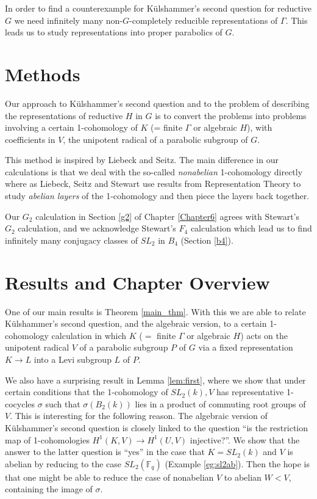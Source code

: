 In order to find a counterexample for K\"ulshammer's second question for reductive $G$ we need infinitely many non-$G$-completely reducible representations of $\Gamma$. This leads us to study representations into proper parabolics of $G$.

\section{Methods}

Our approach to K\"ulshammer's second question and to the problem of describing the representations of reductive $H$ in $G$ is to convert the problems into problems involving a certain 1-cohomology of $K$ (= finite $\Gamma$ or algebraic $H$), with coefficients in $V$, the unipotent radical of a parabolic subgroup of $G$.

This method is inspired by Liebeck and Seitz.
The main difference in our calculations is that we deal with the so-called \emph{nonabelian} 1-cohomology directly where as Liebeck, Seitz and Stewart use results from Representation Theory to study \emph{abelian layers} of the 1-cohomology and then piece the layers back together.

Our $G_2$ calculation in Section \ref{g2} of Chapter \ref{Chapter6} agrees with Stewart's $G_2$ calculation, and we acknowledge Stewart's $F_4$ calculation which lead us to find infinitely many conjugacy classes of $SL_2$ in $B_4$ (Section \ref{b4}).

\section{Results and Chapter Overview}

One of our main results is Theorem \ref{main_thm}. With this we are able to relate K\"ulshammer's second question, and the algebraic version, to a certain 1-cohomology calculation in which $K$ ($=$ finite $\Gamma$ or algebraic $H$) acts on the unipotent radical $V$ of a parabolic subgroup $P$ of $G$ via a fixed representation $K \rightarrow L$ into a Levi subgroup $L$ of $P$.

We also have a surprising result in Lemma \ref{lem:first}, where we show that under certain conditions that the 1-cohomology of $SL_2(k), V$ has representative 1-cocycles $\sigma$ such that $\sigma(B_2(k))$ lies in a product of commuting root groups of $V$. This is interesting for the following reason. The algebraic version of K\"ulshammer's second question is closely linked to the question ``is the restriction map of 1-cohomologies $H^1(K, V)\rightarrow H^1(U,V)$ injective?''.
We show that the answer to the latter question is ``yes'' in the case that $K=SL_2(k)$ and $V$ is abelian by reducing to the case $SL_2(\mathbb{F}_q)$ (Example \ref{eg:sl2ab}). Then the hope is that one might be able to reduce the case of nonabelian $V$ to abelian $W<V$, containing the image of $\sigma$.

